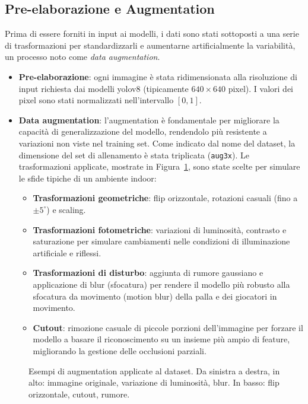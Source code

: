 \documentclass[12pt,a4paper,openright,twoside]{book}
\begin{document}
\subsection{Pre-elaborazione e Augmentation}
\label{subsec:augmentation}

Prima di essere forniti in input ai modelli, i dati sono stati sottoposti a una serie di trasformazioni per 
standardizzarli e aumentarne artificialmente la variabilità, un processo noto come \emph{data augmentation}.

\begin{itemize}
  \item \textbf{Pre-elaborazione}: ogni immagine è stata ridimensionata alla risoluzione di input richiesta dai 
  modelli \ac{yolo}v8 (tipicamente $640\times640$ pixel).
  I valori dei pixel sono stati normalizzati nell'intervallo $[0, 1]$.
  \item \textbf{Data augmentation}: l'augmentation è fondamentale per migliorare la capacità di generalizzazione del 
  modello, rendendolo più resistente a variazioni non viste nel training set. Come indicato dal nome del dataset, 
  la dimensione del set di allenamento è stata triplicata (\texttt{aug3x}). Le trasformazioni applicate, mostrate in 
  Figura~\ref{fig:augmentation}, sono state scelte per simulare le sfide tipiche di un ambiente indoor: %
  \begin{itemize}
    \item \textbf{Trasformazioni geometriche}: flip orizzontale, rotazioni casuali (fino a $\pm 5^{\circ}$) e scaling.
    \item \textbf{Trasformazioni fotometriche}: variazioni di luminosità, contrasto e saturazione per simulare 
    cambiamenti nelle condizioni di illuminazione artificiale e riflessi.
    \item \textbf{Trasformazioni di disturbo}: aggiunta di rumore gaussiano e applicazione di blur (sfocatura) 
    per rendere il modello più robusto alla sfocatura da movimento (motion blur) della palla e dei giocatori in movimento.
    \item \textbf{Cutout}: rimozione casuale di piccole porzioni dell'immagine per forzare il 
    modello a basare il riconoscimento su un insieme più ampio di feature, migliorando la gestione delle occlusioni parziali.
  \end{itemize}
\end{itemize}

\begin{figure}[h]
  \centering
  \caption{Esempi di augmentation applicate al dataset. Da sinistra a destra, in alto: immagine originale, variazione
  di luminosità, blur. In basso: flip orizzontale, cutout, rumore.}
  \label{fig:augmentation}
\end{figure}
\end{document}
